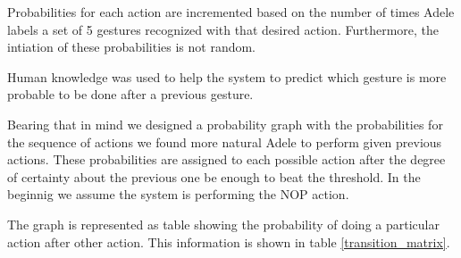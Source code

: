 Probabilities for each action are incremented based on the number of times Adele labels a set of 5 gestures recognized with that desired action. Furthermore, the intiation of these probabilities is not random. 

Human knowledge was used to help the system to predict which gesture is more probable to be done after a previous gesture. 

Bearing that in mind we designed a probability graph with the probabilities for the sequence of actions we found more natural Adele to perform given previous actions. These probabilities are assigned to each possible action after the degree of certainty about the previous one be enough to beat the threshold. In the beginnig we assume the system is performing the NOP action.

The graph is represented as table showing the probability of doing a particular action after other action. This information is shown in table \ref{transition_matrix}.


